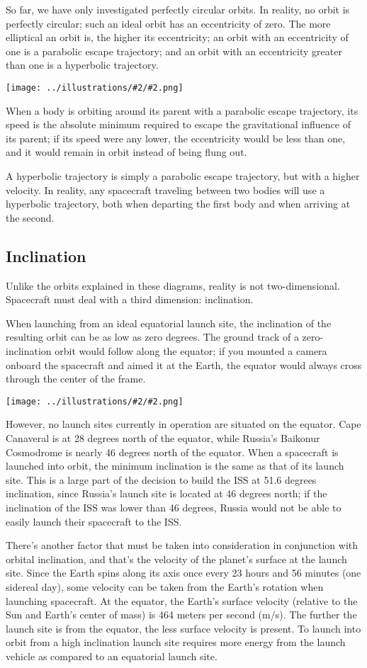 \documentclass[oneside,a5paper]{book}
\newcommand{\widthillustration}[2]{{\centering\texttt{[image: ../illustrations/\#2/\#2.png]}}}
\newcommand{\illustration}[1]{\widthillustration{\linewidth}{#1}}
\begin{document}
So far, we have only investigated perfectly circular orbits. In
reality, no orbit is perfectly circular; such an ideal orbit has an
eccentricity of zero. The more elliptical an orbit is, the higher its
eccentricity; an orbit with an eccentricity of one is a parabolic
escape trajectory; and an orbit with an eccentricity greater than one
is a hyperbolic trajectory.

\illustration{eccentricity}

When a body is orbiting around its parent with a parabolic escape
trajectory, its speed is the absolute minimum required to escape the
gravitational influence of its parent; if its speed were any lower,
the eccentricity would be less than one, and it would remain in orbit
instead of being flung out.

A hyperbolic trajectory is simply a parabolic escape trajectory, but
with a higher velocity. In reality, any spacecraft traveling between
two bodies will use a hyperbolic trajectory, both when departing the
first body and when arriving at the second.

\subsection{Inclination}

Unlike the orbits explained in these diagrams, reality is not
two-dimensional. Spacecraft must deal with a third dimension:
inclination.

When launching from an ideal equatorial launch site, the inclination
of the resulting orbit can be as low as zero degrees. The ground track
of a zero-inclination orbit would follow along the equator; if you
mounted a camera onboard the spacecraft and aimed it at the Earth, the
equator would always cross through the center of the frame.

\illustration{inclination}

However, no launch sites currently in operation are situated on the
equator. Cape Canaveral is at 28 degrees north of the equator, while
Russia’s Baikonur Cosmodrome is nearly 46 degrees north of the
equator. When a spacecraft is launched into orbit, the minimum
inclination is the same as that of its launch site. This is a large
part of the decision to build the ISS at 51.6 degrees inclination,
since Russia’s launch site is located at 46 degrees north; if the
inclination of the ISS was lower than 46 degrees, Russia would not be
able to easily launch their spacecraft to the ISS.

There’s another factor that must be taken into consideration in
conjunction with orbital inclination, and that’s the velocity of the
planet’s surface at the launch site. Since the Earth spins along its
axis once every 23 hours and 56 minutes (one sidereal day), some
velocity can be taken from the Earth’s rotation when launching
spacecraft. At the equator, the Earth’s surface velocity (relative to
the Sun and Earth’s center of mass) is 464 meters per second
(m/s). The further the launch site is from the equator, the less
surface velocity is present. To launch into orbit from a high
inclination launch site requires more energy from the launch vehicle
as compared to an equatorial launch site.
\end{document}
